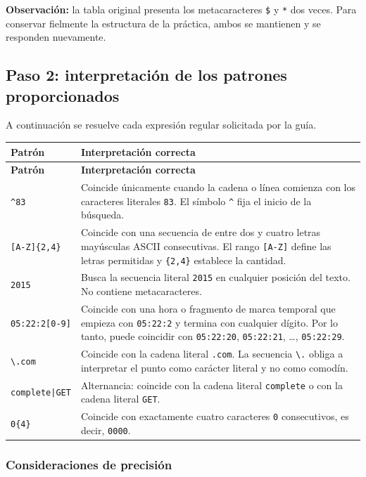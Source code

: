 \documentclass[11pt,a4paper]{article}
\newcommand{\regex}[1]{\texttt{#1}}
\begin{document}
\textbf{Observación:} la tabla original presenta los metacaracteres \regex{\$} y \regex{*} dos veces. Para conservar fielmente la estructura de la práctica, ambos se mantienen y se responden nuevamente.

\subsection{Paso 2: interpretación de los patrones proporcionados}

A continuación se resuelve cada expresión regular solicitada por la guía.

\begin{longtable}{>{\raggedright\arraybackslash}p{} p{}}
\toprule
\textbf{Patrón} & \textbf{Interpretación correcta} \\
\midrule
\endfirsthead
\toprule
\textbf{Patrón} & \textbf{Interpretación correcta} \\
\midrule
\endhead
\regex{\string^83} & Coincide únicamente cuando la cadena o línea comienza con los caracteres literales \texttt{83}. El símbolo \regex{\string^} fija el inicio de la búsqueda. \\
\regex{[A-Z]\{2,4\}} & Coincide con una secuencia de entre dos y cuatro letras mayúsculas ASCII consecutivas. El rango \regex{[A-Z]} define las letras permitidas y \regex{\{2,4\}} establece la cantidad. \\
\regex{2015} & Busca la secuencia literal \texttt{2015} en cualquier posición del texto. No contiene metacaracteres. \\
\regex{05:22:2[0-9]} & Coincide con una hora o fragmento de marca temporal que empieza con \texttt{05:22:2} y termina con cualquier dígito. Por lo tanto, puede coincidir con \texttt{05:22:20}, \texttt{05:22:21}, \ldots, \texttt{05:22:29}. \\
\regex{\textbackslash .com} & Coincide con la cadena literal \texttt{.com}. La secuencia \regex{\textbackslash .} obliga a interpretar el punto como carácter literal y no como comodín. \\
\regex{complete|GET} & Alternancia: coincide con la cadena literal \texttt{complete} o con la cadena literal \texttt{GET}. \\
\regex{0\{4\}} & Coincide con exactamente cuatro caracteres \texttt{0} consecutivos, es decir, \texttt{0000}. \\
\bottomrule
\end{longtable}

\subsubsection{Consideraciones de precisión}
\end{document}
